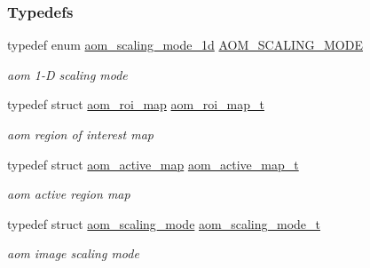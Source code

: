 \subsubsection*{Typedefs}
\begin{DoxyCompactItemize}
\item 
typedef enum \hyperlink{group__aom__encoder_ga2a1791d26fca39303154f0f9ece3e295}{aom\+\_\+scaling\+\_\+mode\+\_\+1d} \hyperlink{group__aom__encoder_ga6694eedd50b128415a3434404c56d73d}{A\+O\+M\+\_\+\+S\+C\+A\+L\+I\+N\+G\+\_\+\+M\+O\+DE}
\begin{DoxyCompactList}\small\item\em aom 1-\/D scaling mode \end{DoxyCompactList}\item 
typedef struct \hyperlink{structaom__roi__map}{aom\+\_\+roi\+\_\+map} \hyperlink{group__aom__encoder_gae682e0031e08270a2e0a60928305a830}{aom\+\_\+roi\+\_\+map\+\_\+t}
\begin{DoxyCompactList}\small\item\em aom region of interest map \end{DoxyCompactList}\item 
typedef struct \hyperlink{structaom__active__map}{aom\+\_\+active\+\_\+map} \hyperlink{group__aom__encoder_gaaba582f3bd806cb3a0a6b8a66c1041e5}{aom\+\_\+active\+\_\+map\+\_\+t}
\begin{DoxyCompactList}\small\item\em aom active region map \end{DoxyCompactList}\item 
typedef struct \hyperlink{structaom__scaling__mode}{aom\+\_\+scaling\+\_\+mode} \hyperlink{group__aom__encoder_ga8d9d932b058ba7e762cd39d403dd4e68}{aom\+\_\+scaling\+\_\+mode\+\_\+t}
\begin{DoxyCompactList}\small\item\em aom image scaling mode \end{DoxyCompactList}\end{DoxyCompactItemize}
